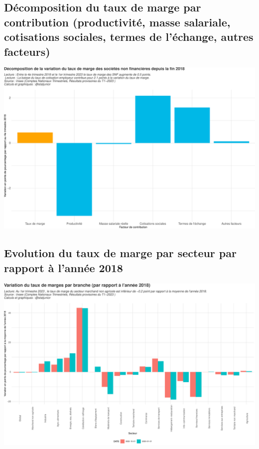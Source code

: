 \documentclass[
  paper=a4,
  ,captions=tableheading
]{scrartcl}
\begin{document}
\hypertarget{duxe9composition-du-taux-de-marge-par-contribution-productivituxe9-masse-salariale-cotisations-sociales-termes-de-luxe9change-autres-facteurs}{%
\subsection{Décomposition du taux de marge par contribution
(productivité, masse salariale, cotisations sociales, termes de
l'échange, autres
facteurs)}\label{duxe9composition-du-taux-de-marge-par-contribution-productivituxe9-masse-salariale-cotisations-sociales-termes-de-luxe9change-autres-facteurs}}

\includegraphics{rapport_pdf_compte_branche_files/figure-latex/unnamed-chunk-22-1.pdf}

\hypertarget{evolution-du-taux-de-marge-par-secteur-par-rapport-uxe0-lannuxe9e-2018}{%
\subsection{Evolution du taux de marge par secteur par rapport à l'année
2018}\label{evolution-du-taux-de-marge-par-secteur-par-rapport-uxe0-lannuxe9e-2018}}

\includegraphics{rapport_pdf_compte_branche_files/figure-latex/unnamed-chunk-23-1.pdf}
\end{document}
